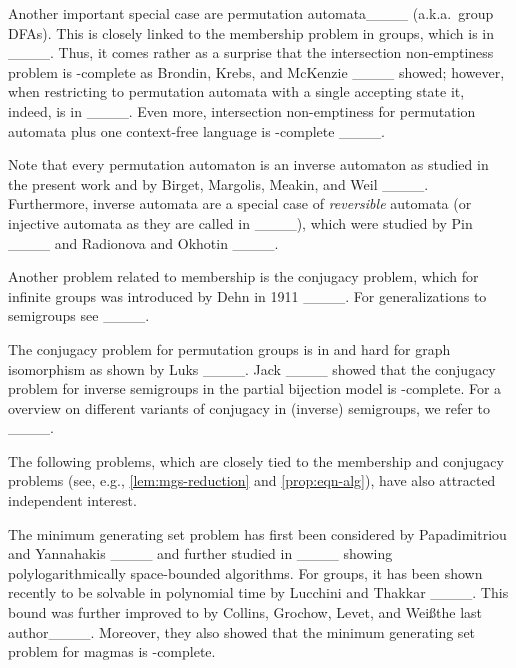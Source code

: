 Another important special case are permutation automata____ (a.k.a.\ group DFAs). 
This is closely linked to the membership problem in groups, which is in \NC ____. 
Thus, it comes rather as a surprise that the intersection non-emptiness problem is \NP-complete as Brondin, Krebs, and McKenzie ____ showed; however, when restricting to permutation automata with a single accepting state it, indeed, is in \NC ____.
Even more, intersection non-emptiness for permutation automata plus one context-free language is \PSPACE-complete ____.

Note that every permutation automaton is an inverse automaton as studied in the present work and \eg by Birget, Margolis, Meakin, and Weil ____.
Furthermore, inverse automata are a special case of \emph{reversible} automata (or injective automata as they are called in ____), which were studied \eg by Pin ____ and Radionova and Okhotin ____.




\medbreak

Another problem related to membership is the conjugacy problem, which for infinite groups was introduced by Dehn in 1911 ____.
For generalizations to semigroups see ____.

The conjugacy problem for permutation groups is in \NP and hard for graph isomorphism as shown by Luks ____.
Jack ____ showed that the conjugacy problem for inverse semigroups in the partial bijection model is \PSPACE-complete. 
For a overview on different variants of conjugacy in (inverse) semigroups, we refer to ____.

\medbreak

The following problems, which are closely tied to the membership and conjugacy problems (see, e.g., \cref{lem:mgs-reduction} and \cref{prop:eqn-alg}), have also attracted independent interest.


The minimum generating set problem has first been considered by Papadimitriou and Yannahakis ____ and further studied in ____ showing polylogarithmically space-bounded algorithms.
For groups, it has been shown recently to be solvable in polynomial time by Lucchini and Thakkar ____.
This bound was further improved to \NC by Collins, Grochow, Levet, and \ifAnonimous Weiß\else the last author\fi____.
Moreover, they also showed that the minimum generating set problem for magmas is \NP-complete.



